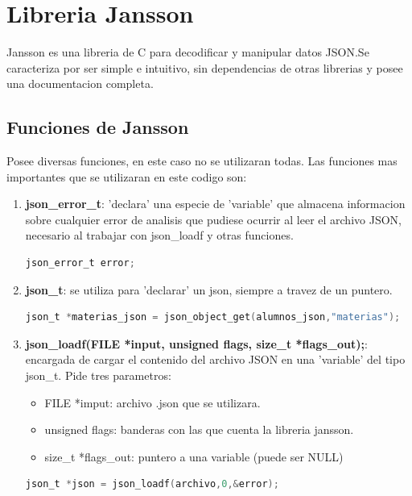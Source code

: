 \section{Libreria Jansson}
Jansson es una libreria de C para decodificar y manipular datos JSON.Se caracteriza por ser simple e intuitivo, 
sin dependencias de otras librerias y posee una documentacion completa.

\subsection*{Funciones de Jansson}
Posee diversas funciones, en este caso no se utilizaran todas. Las funciones mas importantes que se utilizaran en este codigo son:
\begin{enumerate}
    \item  \textbf{json\_error\_t}: 'declara' una especie de 'variable' que almacena informacion sobre cualquier error de analisis que pudiese ocurrir al leer el archivo JSON, necesario al trabajar con json\_loadf y otras funciones.
    \begin{lstlisting}[style=CodeStyle, language=C, caption={json\_error\_t}, label={lst:codigo}]
        json_error_t error;
    \end{lstlisting}
    \item  \textbf{json\_t}: se utiliza para 'declarar' un json, siempre a travez de un puntero.
    \begin{lstlisting}[style=CodeStyle, language=C, caption={json\_t}, label={lst:codigo}]
                json_t *materias_json = json_object_get(alumnos_json,"materias");
    \end{lstlisting}
    \item  \textbf{json\_loadf(FILE *input, unsigned flags, size\_t *flags\_out);}: encargada de cargar el contenido del archivo JSON en una 'variable' del tipo json\_t. Pide tres parametros:
    \begin{itemize}
        \item FILE *imput: archivo .json que se utilizara.
        \item unsigned flags: banderas con las que cuenta la libreria jansson.
        \item size\_t *flags\_out: puntero a una variable (puede ser NULL)
    \end{itemize}
    \begin{lstlisting}[style=CodeStyle, language=C, caption={json\_loadf}, label={lst:codigo}]
        json_t *json = json_loadf(archivo,0,&error);
    \end{lstlisting}

\end{enumerate}

